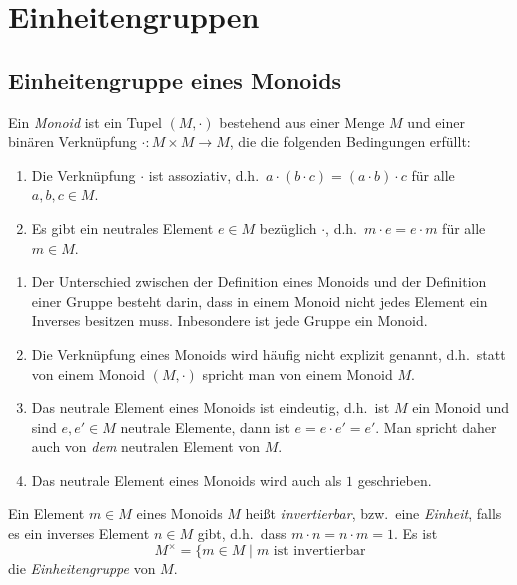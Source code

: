 \section{Einheitengruppen}


\subsection{Einheitengruppe eines Monoids}
\begin{defi}
 Ein \emph{Monoid} ist ein Tupel $(M, \cdot)$ bestehend aus einer Menge $M$ und einer binären Verknüpfung $\cdot \colon M \times M \to M$, die die folgenden Bedingungen erfüllt:
 \begin{enumerate}[label=\roman*)]
  \item
   Die Verknüpfung $\cdot$ ist assoziativ, d.h.\ $a \cdot (b \cdot c) = (a \cdot b) \cdot c$ für alle $a,b,c \in M$.
  \item
   Es gibt ein neutrales Element $e \in M$ bezüglich $\cdot$, d.h.\ $m \cdot e = e \cdot m$ für alle $m \in M$.
 \end{enumerate}
\end{defi}

\begin{bem}
 \begin{enumerate}
  \item
   Der Unterschied zwischen der Definition eines Monoids und der Definition einer Gruppe besteht darin, dass in einem Monoid nicht jedes Element ein Inverses besitzen muss. Inbesondere ist jede Gruppe ein Monoid.
  \item
   Die Verknüpfung eines Monoids wird häufig nicht explizit genannt, d.h.\ statt von einem Monoid $(M,\cdot)$ spricht man von einem Monoid $M$.
  \item
   Das neutrale Element eines Monoids ist eindeutig, d.h.\ ist $M$ ein Monoid und sind $e, e' \in M$ neutrale Elemente, dann ist $e = e \cdot e' = e'$. Man spricht daher auch von \emph{dem} neutralen Element von $M$.
  \item
   Das neutrale Element eines Monoids wird auch als $1$ geschrieben.
 \end{enumerate}
\end{bem}

\begin{defi}
 Ein Element $m \in M$ eines Monoids $M$ heißt \emph{invertierbar}, bzw.\ eine \emph{Einheit}, falls es ein inverses Element $n \in M$ gibt, d.h.\ dass $m \cdot n = n \cdot m = 1$. Es ist
 \[
  M^\times = \{m \in M \mid \text{$m$ ist invertierbar}
 \]
 die \emph{Einheitengruppe} von $M$.
\end{defi}


